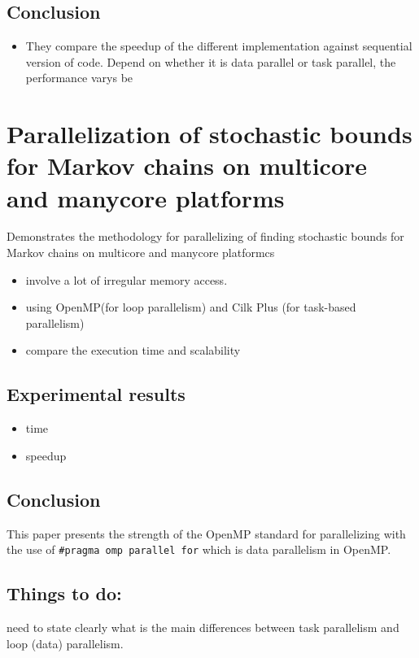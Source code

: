 \documentclass[11pt]{article}
\begin{document}
\subsection{Conclusion}
\label{sec-5-3}
\begin{itemize}
\item They compare the speedup of the different implementation against sequential version of code. Depend on whether it is data parallel or task parallel, the performance varys be
\end{itemize}
\section{Parallelization of stochastic bounds for Markov chains on multicore and manycore platforms \cite{bylina18_paral_stoch_bound_markov_chain}}
\label{sec-6}
Demonstrates the methodology for parallelizing of finding stochastic bounds for Markov chains on multicore and manycore platformcs
\begin{itemize}
\item involve a lot of irregular memory access.
\item using OpenMP(for loop parallelism) and Cilk Plus (for task-based parallelism)
\item compare the execution time and scalability
\end{itemize}

\subsection{Experimental results}
\label{sec-6-1}
\begin{itemize}
\item time
\item speedup
\end{itemize}
\subsection{Conclusion}
\label{sec-6-2}
This paper presents the strength of the OpenMP standard for parallelizing with the use of \verb~#pragma omp parallel for~ which is data parallelism in OpenMP.

\subsection{Things to do:}
\label{sec-6-3}
need to state clearly what is the main differences between task parallelism and loop (data) parallelism.
\end{document}
